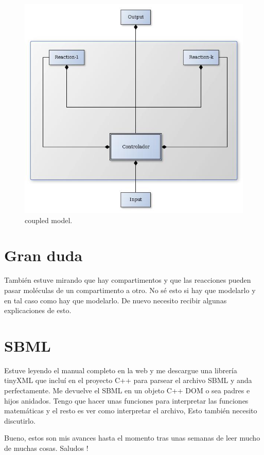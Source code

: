 \documentclass[12pt]{article}
\begin{document}
\begin{figure}[h!]
 \centering
  \includegraphics[width=1\textwidth]{coupled-model.jpg}
 \caption{coupled model.}
\end{figure}

\section*{Gran duda}
También estuve mirando que hay compartimentos y que las reacciones pueden pasar moléculas de un compartimento a otro. No sé esto si hay que modelarlo y en tal caso como hay que modelarlo. De nuevo necesito recibir algunas explicaciones de esto.

\section*{SBML}
Estuve leyendo el manual completo en la web y me descargue una librería tinyXML que incluí en el proyecto C++ para parsear el archivo SBML y anda perfectamente. Me devuelve el SBML en un objeto C++ DOM o sea padres e hijos anidados. Tengo que hacer unas funciones para interpretar las funciones matemáticas y el resto es ver como interpretar el archivo, Esto también necesito discutirlo.

Bueno, estos son mis avances hasta el momento tras unas semanas de leer mucho de muchas cosas.
Saludos !










  
\end{document}
